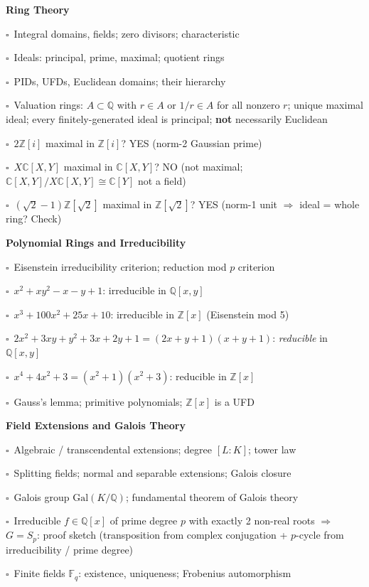 \documentclass[11pt,a4paper]{article}
\newcommand{\chk}{\textcolor{rulegray}{$\square$}\ }
\begin{document}
\begin{subtopics}
  \item \textbf{Ring Theory}
  \begin{subtopics}
    \item \chk Integral domains, fields; zero divisors; characteristic
    \item \chk Ideals: principal, prime, maximal; quotient rings
    \item \chk PIDs, UFDs, Euclidean domains; their hierarchy
    \item \chk Valuation rings: $A\subset\mathbb{Q}$ with $r\in A$ or $1/r\in A$ for all nonzero $r$; unique maximal ideal; every finitely-generated ideal is principal; \textbf{not} necessarily Euclidean
    \item \chk $2\mathbb{Z}[i]$ maximal in $\mathbb{Z}[i]$? YES (norm-2 Gaussian prime)
    \item \chk $X\mathbb{C}[X,Y]$ maximal in $\mathbb{C}[X,Y]$? NO (not maximal; $\mathbb{C}[X,Y]/X\mathbb{C}[X,Y]\cong\mathbb{C}[Y]$ not a field)
    \item \chk $(\sqrt{2}-1)\mathbb{Z}[\sqrt{2}]$ maximal in $\mathbb{Z}[\sqrt{2}]$? YES (norm-1 unit $\Rightarrow$ ideal = whole ring? Check)
  \end{subtopics}

  \item \textbf{Polynomial Rings and Irreducibility}
  \begin{subtopics}
    \item \chk Eisenstein irreducibility criterion; reduction mod $p$ criterion
    \item \chk $x^2+xy^2-x-y+1$: irreducible in $\mathbb{Q}[x,y]$
    \item \chk $x^3+100x^2+25x+10$: irreducible in $\mathbb{Z}[x]$ (Eisenstein mod 5)
    \item \chk $2x^2+3xy+y^2+3x+2y+1=(2x+y+1)(x+y+1)$: \textit{reducible} in $\mathbb{Q}[x,y]$
    \item \chk $x^4+4x^2+3=(x^2+1)(x^2+3)$: reducible in $\mathbb{Z}[x]$
    \item \chk Gauss's lemma; primitive polynomials; $\mathbb{Z}[x]$ is a UFD
  \end{subtopics}

  \item \textbf{Field Extensions and Galois Theory}
  \begin{subtopics}
    \item \chk Algebraic / transcendental extensions; degree $[L:K]$; tower law
    \item \chk Splitting fields; normal and separable extensions; Galois closure
    \item \chk Galois group $\mathrm{Gal}(K/\mathbb{Q})$; fundamental theorem of Galois theory
    \item \chk Irreducible $f\in\mathbb{Q}[x]$ of prime degree $p$ with exactly 2 non-real roots $\Rightarrow$ $G=S_p$: proof sketch (transposition from complex conjugation + $p$-cycle from irreducibility / prime degree)
    \item \chk Finite fields $\mathbb{F}_q$: existence, uniqueness; Frobenius automorphism
  \end{subtopics}


\end{subtopics}
\end{document}
